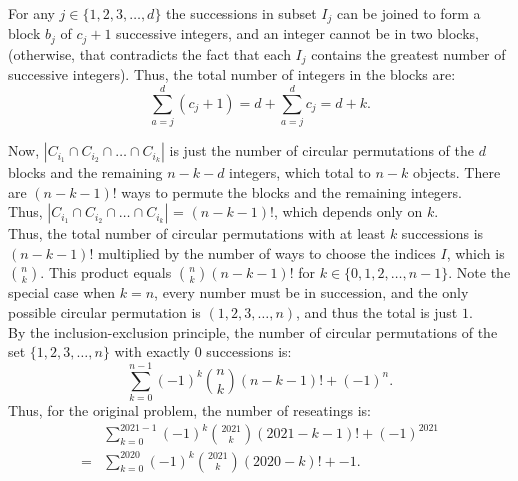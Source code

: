 \documentclass{article}
\begin{document}
For any $j\in \{1,2,3,\dots , d \}$ the successions in subset $I_j$ can be joined to form a block $b_j$ of $c_j + 1$ successive integers, and an integer cannot be in two blocks, (otherwise, that contradicts the fact that each $I_j$ contains the greatest number of successive integers). Thus, the total number of integers in the blocks are:
$$\sum_{a=j}^d (c_j + 1) = d + \sum_{a=j}^d c_j = d + k.$$

Now, $\left| C_{i_1}\cap C_{i_2} \cap \dots \cap C_{i_k} \right|$ is just the number of circular permutations of the $d$ blocks and the remaining $n-k-d$ integers, which total to $n-k$ objects. There are $(n-k-1)!$ ways to permute the blocks and the remaining integers. \\

Thus, $\left| C_{i_1}\cap C_{i_2} \cap \dots \cap C_{i_k} \right|$ =  $(n-k-1)!$, which depends only on $k$. \\

Thus, the total number of circular permutations with at least $k$ successions is $(n-k-1)!$ multiplied by the number of ways to choose the indices $I$, which is $\binom{n}{k}$. This product equals $\binom{n}{k}(n-k-1)!$ for $k\in \{0,1,2,\dots, n-1 \}$. Note the special case when $k = n$, every number must be in succession, and the only possible circular permutation is $(1,2,3,\dots , n)$, and thus the total is just $1$. \\

By the inclusion-exclusion principle, the number of circular permutations of the set $\{1,2,3,\dots , n\}$ with exactly 0 successions is:
$$ \sum_{k=0}^{n-1} (-1)^k \binom{n}{k}(n-k-1)! + (-1)^n.$$
Thus, for the original problem, the number of reseatings is:
\begin{align*}
    &\sum_{k=0}^{2021-1} (-1)^k \binom{2021}{k}(2021-k-1)! + (-1)^{2021} \\
    = &\boxed{\sum_{k=0}^{2020} (-1)^k \binom{2021}{k}(2020-k)! + -1}.
\end{align*} 
\end{document}
